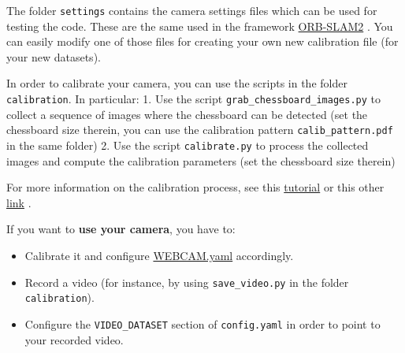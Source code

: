 \documentclass{article}
\begin{document}
The folder \texttt{settings} contains the camera settings files which
can be used for testing the code. These are the same used in the
framework \href{https://github.com/raulmur/ORB_SLAM2}{ORB-SLAM2} \cite{ORB_SLAM2}. You
can easily modify one of those files for creating your own new
calibration file (for your new datasets).

In order to calibrate your camera, you can use the scripts in the folder
\texttt{calibration}. In particular: 1. Use the script
\texttt{grab\_chessboard\_images.py} to collect a sequence of images
where the chessboard can be detected (set the chessboard size therein,
you can use the calibration pattern \texttt{calib\_pattern.pdf} in the
same folder) 2. Use the script \texttt{calibrate.py} to process the
collected images and compute the calibration parameters (set the
chessboard size therein)

For more information on the calibration process, see this
\href{https://learnopencv.com/camera-calibration-using-opencv/}{tutorial} \cite{learnopencv}
or this other
\href{https://docs.opencv.org/4.x/dc/dbb/tutorial_py_calibration.html}{link} \cite{opencv}.

If you want to \textbf{use your camera}, you have to: 
\begin{itemize}
\item Calibrate it and configure \href{./settings/WEBCAM.yaml}{WEBCAM.yaml} accordingly.
\item Record a video (for instance, by using \texttt{save\_video.py} in the folder \texttt{calibration}). 
\item Configure the \texttt{VIDEO\_DATASET} section of \texttt{config.yaml} in order to point to your recorded video.
\end{itemize}


%
\end{document}
